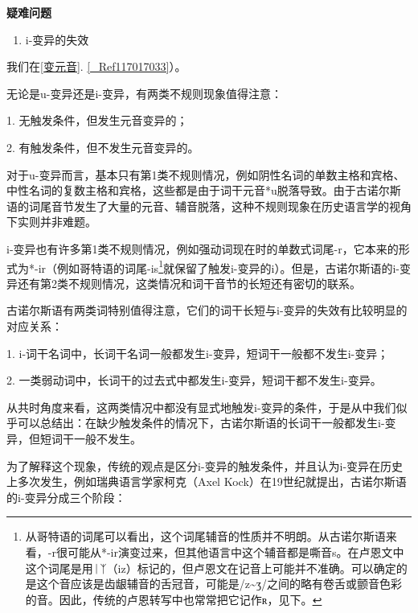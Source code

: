 {{\textbf{疑难问题}

\begin{enumerate}
\def\labelenumi{\arabic{enumi})}
\item
  i-变异的失效
\end{enumerate}

我们在\ref{变元音}.
\ref{_Ref117017033}）。

无论是u-变异还是i-变异，有两类不规则现象值得注意：

1. 无触发条件，但发生元音变异的；

2. 有触发条件，但不发生元音变异的。

对于u-变异而言，基本只有第1类不规则情况，例如阴性名词的单数主格和宾格、中性名词的复数主格和宾格，这些都是由于词干元音*u脱落导致。由于古诺尔斯语的词尾音节发生了大量的元音、辅音脱落，这种不规则现象在历史语言学的视角下实则并非难题。

i-变异也有许多第1类不规则情况，例如强动词现在时的单数式词尾-r，它本来的形式为*-ir（例如哥特语的词尾-is\footnote{从哥特语的词尾可以看出，这个词尾辅音的性质并不明朗。从古诺尔斯语来看，-r很可能从*-ir演变过来，但其他语言中这个辅音都是嘶音s。在卢恩文中这个词尾是用ᛁᛉ（iz）标记的，但卢恩文在记音上可能并不准确。可以确定的是这个音应该是齿龈辅音的舌冠音，可能是/z\textasciitilde ʒ/之间的略有卷舌或颤音色彩的音。因此，传统的卢恩转写中也常常把它记作ʀ，见下。}就保留了触发i-变异的i）。但是，古诺尔斯语的i-变异还有第2类不规则情况，这类情况和词干音节的长短还有密切的联系。

古诺尔斯语有两类词特别值得注意，它们的词干长短与i-变异的失效有比较明显的对应关系：

1. i-词干名词中，长词干名词一般都发生i-变异，短词干一般都不发生i-变异；

2. 一类弱动词中，长词干的过去式中都发生i-变异，短词干都不发生i-变异。

从共时角度来看，这两类情况中都没有显式地触发i-变异的条件，于是从中我们似乎可以总结出：在缺少触发条件的情况下，古诺尔斯语的长词干一般都发生i-变异，但短词干一般不发生。

为了解释这个现象，传统的观点是区分i-变异的触发条件，并且认为i-变异在历史上多次发生，例如瑞典语言学家柯克（Axel
Kock）在19世纪就提出，古诺尔斯语的i-变异分成三个阶段：

}}
